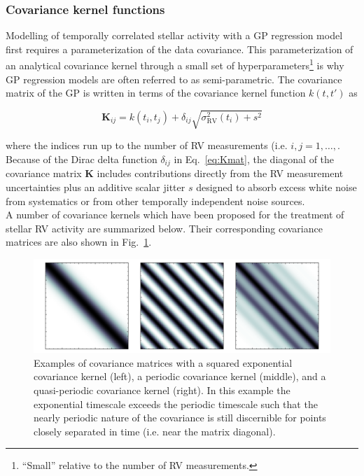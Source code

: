 \subsubsection{Covariance kernel functions}
Modelling of temporally correlated stellar activity with a GP regression model first requires
a parameterization of the data covariance. This parameterization of an analytical
covariance kernel through a small set of hyperparameters\footnote{``Small''
  relative to the number of RV measurements.} is why GP regression models are often referred to
as semi-parametric. The covariance matrix of the GP is written in terms of the covariance kernel
function $k(t,t')$ as

\begin{equation}
  \mathbf{K}_{ij} = k(t_i,t_j) + \delta_{ij} \sqrt{\sigma_{\text{RV}}^2(t_i) + s^2} 
\label{eq:Kmat}
\end{equation}

\noindent where the indices run up to the number of RV measurements (i.e. $i,j=1,\dots,$\nrv{)}.
Because of the Dirac delta function $\delta_{ij}$ in Eq.~\ref{eq:Kmat}, the 
diagonal of the covariance matrix $\mathbf{K}$ includes contributions directly from the
RV measurement uncertainties \sigRV{} plus an additive scalar jitter $s$ designed to absorb excess
white noise from systematics or from other temporally independent noise sources. \\

A number of covariance kernels which have been proposed
for the treatment of stellar RV activity are summarized below. Their corresponding covariance
matrices are also shown in Fig.~\ref{fig:matrices}. \\

\begin{figure}
  \centering
  \includegraphics[width=\hsize]{figures/gpmatrices.png}
  \caption[Example of covariance matrices.]
          {Examples of covariance matrices with a squared exponential covariance kernel (left),
            a periodic covariance kernel (middle), and a quasi-periodic covariance kernel (right).
            In this example the exponential timescale exceeds the periodic timescale such that the
            nearly periodic nature of the covariance is still discernible for points closely separated
          in time (i.e. near the matrix diagonal).}
          \label{fig:matrices}
\end{figure}


